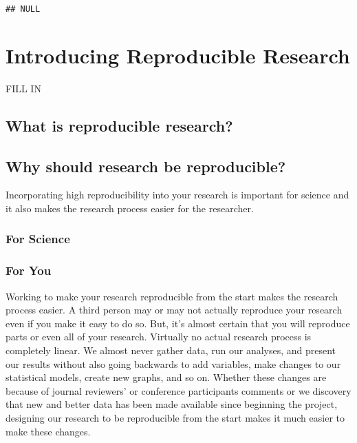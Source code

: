 \documentclass[ChapterTOCs,krantz1]{krantz}\usepackage{graphicx, color}
\makeatletter
\newenvironment{kframe}{%
 \def\at@end@of@kframe{}%
 \ifinner\ifhmode%
  \def\at@end@of@kframe{\end{minipage}}%
  \begin{minipage}{\columnwidth}%
 \fi\fi%
 \def\FrameCommand##1{\hskip\@totalleftmargin \hskip-\fboxsep
 \colorbox{shadecolor}{##1}\hskip-\fboxsep
     \hskip-\linewidth \hskip-\@totalleftmargin \hskip\columnwidth}%
 \MakeFramed {\advance\hsize-\width
   \@totalleftmargin\z@ \linewidth\hsize
   \@setminipage}}%
 {\par\unskip\endMakeFramed%
 \at@end@of@kframe}
\newenvironment{knitrout}{}{} %
\makeatother
\begin{document}

\begin{knitrout}
\color{fgcolor}\begin{kframe}
\begin{verbatim}
## NULL
\end{verbatim}
\end{kframe}
\end{knitrout}


\chapter{Introducing Reproducible Research}%

FILL IN

\section{What is reproducible research?}

\section{Why should research be reproducible?}

Incorporating high reproducibility into your research is important for science and it also makes the research process easier for the researcher. 

\subsection{For Science}

\subsection{For You}

Working to make your research reproducible from the start makes the research process easier. A third person may or may not actually reproduce your research even if you make it easy to do so. But, it's almost certain that you will reproduce parts or even all of your research. Virtually no actual research process is completely linear. We almost never gather data, run our analyses, and present our results without also going backwards to add variables, make changes to our statistical models, create new graphs, and so on. Whether these changes are because of journal reviewers' or conference participants comments or we discovery that new and better data has been made available since beginning the project, designing our research to be reproducible from the start makes it much easier to make these changes.
\end{document}
